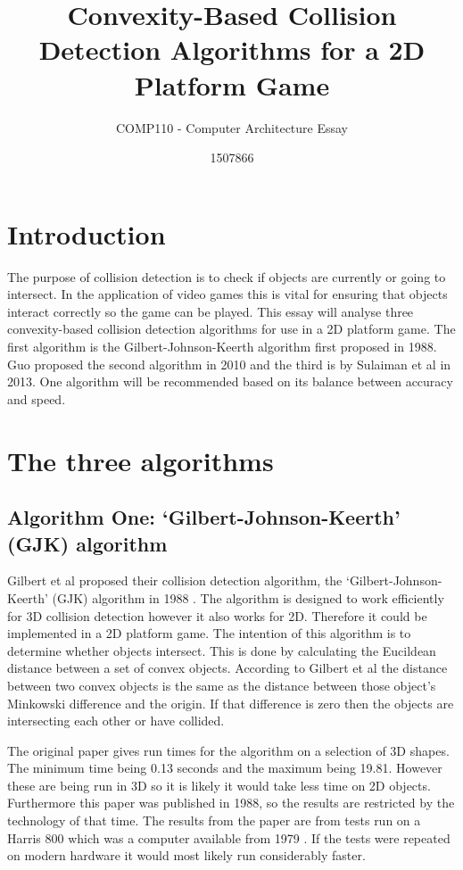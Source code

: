 \documentclass{scrartcl}
\title{Convexity-Based Collision Detection Algorithms for a 2D Platform Game}
\subtitle{COMP110 - Computer Architecture Essay}
\author{1507866}
\begin{document}
	
\maketitle
	
	
\section{Introduction}
	
The purpose of collision detection is to check if objects are currently or going to intersect. In the application of video games this is vital for ensuring that objects interact correctly so the game can be played.  This essay will analyse three convexity-based collision detection algorithms for use in a 2D platform game.  The first algorithm is the Gilbert-Johnson-Keerth algorithm first proposed in 1988. Guo proposed the second algorithm in 2010 and the third is by Sulaiman et al in 2013. One algorithm will be recommended based on its balance between accuracy and speed.

	
\section{The three algorithms}
\subsection{Algorithm One: ‘Gilbert-Johnson-Keerth’ (GJK) algorithm}
Gilbert et al proposed their collision detection algorithm, the ‘Gilbert-Johnson-Keerth’ (GJK) algorithm in 1988 \cite{GJK}. The algorithm is designed to work efficiently for 3D collision detection however it also works for 2D. Therefore it could be implemented in a 2D platform game. The intention of this algorithm is to determine whether objects intersect. This is done by calculating the Eucildean distance between a set of convex objects. According to Gilbert et al the distance between two convex objects is the same as the distance between those object's Minkowski difference and the origin. If that difference is zero then the objects are intersecting each other or have collided.
 
The original paper gives run times for the algorithm on a selection of 3D shapes. The minimum time being 0.13 seconds and the maximum being 19.81. However these are being run in 3D so it is likely it would take less time on 2D objects. Furthermore this paper was published in 1988, so the results are restricted by the technology of that time. The results from the paper are from tests run on a Harris 800 which was a computer available from 1979 \cite{harris800}. If the tests were repeated on modern hardware it would most likely run considerably faster.
\end{document}
